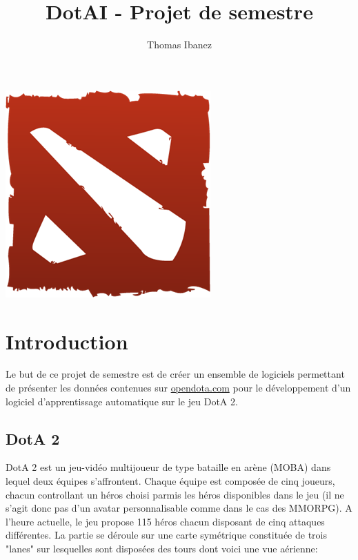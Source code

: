 \documentclass{article}
\title{DotAI - Projet de semestre}
\author{Thomas Ibanez}
\begin{document}
\maketitle
\bigskip
\bigskip
\bigskip
\bigskip
\bigskip
\bigskip
\bigskip
\bigskip
\bigskip
\bigskip

\begin{center}
\includegraphics[scale=1]{logo.png}
\end{center}

\newpage
\tableofcontents

\newpage

\section{Introduction}

Le but de ce projet de semestre est de créer un ensemble de logiciels permettant de présenter les données contenues sur \url{opendota.com} pour le développement d'un logiciel d'apprentissage automatique sur le jeu DotA 2.

\subsection{DotA 2}

DotA 2 est un jeu-vidéo multijoueur de type bataille en arène (MOBA) dans lequel deux équipes s'affrontent. Chaque équipe est composée de cinq joueurs, chacun controllant un héros choisi parmis les héros disponibles dans le jeu (il ne s'agit donc pas d'un avatar personnalisable comme dans le cas des MMORPG). A l'heure actuelle, le jeu propose 115 héros chacun disposant de cinq attaques différentes. La partie se déroule sur une carte symétrique constituée de trois "lanes" sur lesquelles sont disposées des tours dont voici une vue aérienne: \\
\end{document}
